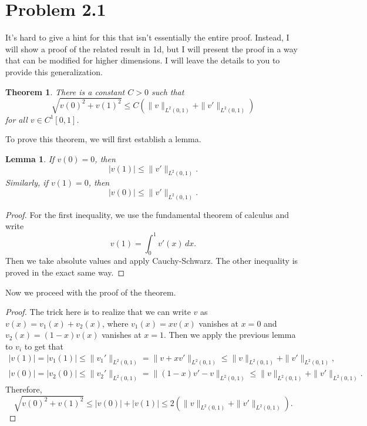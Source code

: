 \documentclass{article}
\theoremstyle{definition}
\theoremstyle{plain}
\newtheorem{theorem}{Theorem}
\newtheorem{lemma}{Lemma}
\theoremstyle{remark}
\begin{document}
\section*{Problem 2.1}
It's hard to give a hint for this that isn't essentially the entire proof.
Instead, I will show a proof of the related result in 1d, but I will present the proof in a way that can be modified for higher dimensions.
I will leave the details to you to provide this generalization.
\begin{theorem}
	There is a constant $C > 0$ such that
	\begin{equation*}
		\sqrt{v(0)^2 + v(1)^2} \leq C(\|v\|_{L^2(0,1)} + \|v'\|_{L^2(0,1)})
	\end{equation*}
	for all $v \in C^1[0,1]$.
\end{theorem}
To prove this theorem, we will first establish a lemma.
\begin{lemma}
	If $v(0) = 0$, then
	\begin{equation*}
		|v(1)| \leq \|v'\|_{L^2(0,1)}.
	\end{equation*}
	Similarly, if $v(1) = 0$, then
	\begin{equation*}
		|v(0)| \leq \|v'\|_{L^2(0,1)}.
	\end{equation*}
\end{lemma}
\begin{proof}
	For the first inequality, we use the fundamental theorem of calculus and write
	\begin{equation*}
		v(1) = \int_0^1v'(x)\,dx.
	\end{equation*}
	Then we take absolute values and apply Cauchy-Schwarz.
	The other inequality is proved in the exact same way.
\end{proof}
Now we proceed with the proof of the theorem.
\begin{proof}
	The trick here is to realize that we can write $v$ as $v(x) = v_1(x) + v_2(x)$, where $v_1(x) = xv(x)$ vanishes at $x=0$ and $v_2(x) = (1-x)v(x)$ vanishes at $x = 1$.
	Then we apply the previous lemma to $v_i$ to get that
	\begin{align*}
		|v(1)| = |v_1(1)| \leq \|v_1'\|_{L^2(0,1)} = \|v + xv'\|_{L^2(0,1)} \leq \|v\|_{L^2(0,1)} + \|v'\|_{L^2(0,1)}, \\
		|v(0)| = |v_2(0)| \leq \|v_2'\|_{L^2(0,1)} = \|(1-x)v'- v\|_{L^2(0,1)} \leq \|v\|_{L^2(0,1)} + \|v'\|_{L^2(0,1)}.
	\end{align*}
	Therefore,
	\begin{equation*}
		\sqrt{v(0)^2 + v(1)^2} \leq |v(0)| + |v(1)| \leq 2\left(\|v\|_{L^2(0,1)} + \|v'\|_{L^2(0,1)}\right).
	\end{equation*}
\end{proof}
\end{document}
